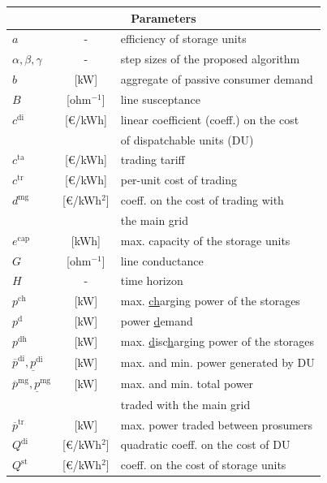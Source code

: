\documentclass{IEEEtran}  %
\newcommand{\0}{\mathbf{0}}
\newcommand{\1}{\mathbf{1}}
\begin{document}
\smallskip
\begin{table}[!h]
	\small 
	\begin{tabular}{l c l}
				\toprule
		\multicolumn{3}{c}{Parameters} \\
		\hline
		$a$ & - & efficiency of storage units\\
		$\alpha, \beta, \gamma$ &- & step sizes of the proposed algorithm \\
		$b$ & [kW]& aggregate of passive consumer demand \\
		$B$ &[ohm$^{-1}$] & line susceptance \\
		$ c^{\mathrm{di}}$ &[\euro/kWh] & linear coefficient (coeff.) on the cost \\ & & of dispatchable units (DU) \\
		$c^{\mathrm{ta}}$ & [\euro/kWh]& trading tariff \\
		$c^{\mathrm{tr}}$ &[\euro/kWh] & per-unit cost of trading \\
		$d^{\mathrm{mg}}$ & [\euro/kWh$^2$]& coeff. on the cost of trading with \\
		& & the main grid \\
		$e^{\mathrm{cap}}$ &[kWh] & max. capacity of the storage units \\
		$G$ & [ohm$^{-1}$]  & line conductance \\
		$H$ &- & time horizon \\
		$p^{\mathrm{ch}}$ &[kW]  & max. \underline{ch}arging power of the storages \\
		$p^{\mathrm{d}}$ &[kW]  & power \underline{d}emand 
		\\
		$p^{\mathrm{dh}}$ &[kW] & max. \underline{d}isc\underline{h}arging power of the storages \\
		$\overline{p}^{\mathrm{di}}, \underline{p}^{\mathrm{di}}$ &[kW]  & max. and min. power generated by DU\\
		$\overline{p}^{\mathrm{mg}}, \underline{p}^{\mathrm{mg}}$ &[kW]  & max. and min. total power  \\ & & traded with the main grid\\
		$\overline{p}^{\mathrm{tr}}$ &[kW]  & max. power traded between prosumers \\
		$Q^{\mathrm{di}}$ &[\euro/kWh$^2$] & quadratic coeff. on the cost of DU \\
		$Q^{\mathrm{st}}$ & [\euro/kWh$^2$]& coeff. on the cost of storage units \\

\end{tabular}
\end{table}
\end{document}
